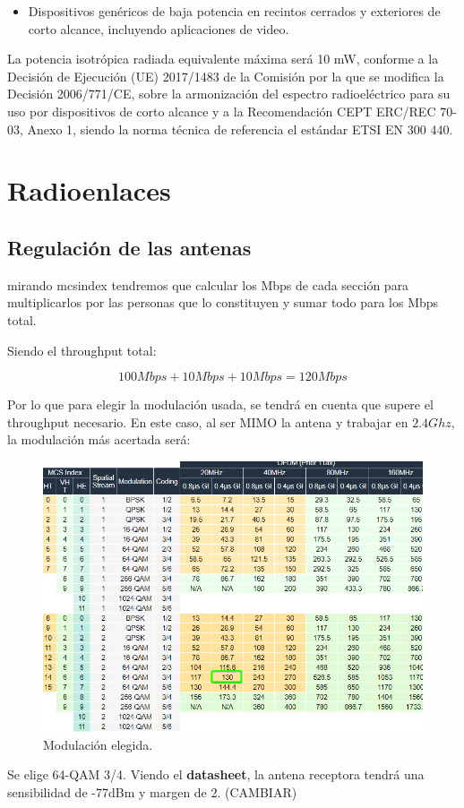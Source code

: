 \documentclass{article}
\begin{document}
\begin{itemize}
    \item Dispositivos genéricos de baja potencia en recintos cerrados y exteriores
    de corto alcance, incluyendo aplicaciones de video.
\end{itemize}
    La potencia isotrópica radiada equivalente máxima será 10 mW, conforme a la
    Decisión de Ejecución (UE) 2017/1483 de la Comisión por la que se modifica la
    Decisión 2006/771/CE, sobre la armonización del espectro radioeléctrico para su uso
    por dispositivos de corto alcance y a la Recomendación CEPT ERC/REC 70-03,
    Anexo 1, siendo la norma técnica de referencia el estándar ETSI EN 300 440. 


\section{Radioenlaces}

\subsection{Regulación de las antenas}

mirando mcsindex tendremos que calcular los Mbps de cada sección para multiplicarlos por las personas que lo constituyen y sumar todo para los Mbps total. 

Siendo el throughput total:

$$100Mbps + 10Mbps + 10Mbps = 120Mbps$$

Por lo que para elegir la modulación usada, se tendrá en cuenta que supere el throughput necesario. En este caso, al ser MIMO la antena y trabajar en $2.4Ghz$, la modulación más acertada será:

\begin{figure}[ht]
    \centering
    \includegraphics[width=0.8
    \linewidth]{src/chrome_GUtrJRqsad.png}
    \caption{\label{fig:mcsindex} Modulación elegida.}
\end{figure}
\newpage
Se elige 64-QAM 3/4. Viendo el \textbf{datasheet}, la antena receptora tendrá una sensibilidad de -77dBm y margen de 2. (CAMBIAR)
\end{document}
